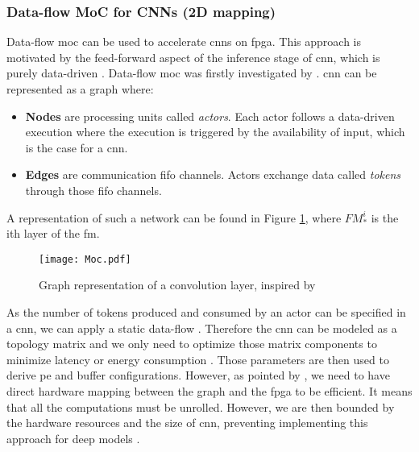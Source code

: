 \subsubsection{Data-flow MoC for CNNs (2D mapping)}
%
%
Data-flow \acrfull{moc} can be used to accelerate \acrshort{cnn}s on \acrshort{fpga}. This approach is motivated by the feed-forward aspect of the inference stage of \acrshort{cnn}, which is purely data-driven \cite{abdelouahab_accelerating_2018}. Data-flow \acrfull{moc} was firstly investigated by \textcite{lin_li_low_2016}. \acrshort{cnn} can be represented as a graph where:
\begin{itemize}
    \item \textbf{Nodes} are processing units called \textit{actors}. Each actor follows a data-driven execution where the execution is triggered by the availability of input, which is the case for a \acrshort{cnn}.
    \item \textbf{Edges} are communication \acrshort{fifo} channels. Actors exchange data called \textit{tokens} through those \acrshort{fifo} channels.
\end{itemize}
A representation of such a network can be found in Figure \ref{fig:moc}, where $FM_{*}^{i}$ is the ith layer of the \acrshort{fm}.
%
\begin{figure}[H]
    \centering
    \texttt{[image: Moc.pdf]}
    \caption{Graph representation of a convolution layer, inspired by \cite{abdelouahab_accelerating_2018}}
    \label{fig:moc}
\end{figure}

As the number of tokens produced and consumed by an actor can be specified in a \acrshort{cnn}, we can apply a static data-flow \cite{lee_static_1987}. Therefore the \acrshort{cnn} can be modeled as a topology matrix and we only need to optimize those matrix components to minimize latency or energy consumption \cite{venieris_latency-driven_2017}. Those parameters are then used to derive \acrshort{pe} and buffer configurations. However, as pointed by \textcite{abdelouahab_tactics_2017}, we need to have direct hardware mapping between the graph and the \acrshort{fpga} to be efficient. It means that all the computations must be unrolled. However, we are then bounded by the hardware resources and the size of \acrshort{cnn}, preventing implementing this approach for deep models \cite{abdelouahab_accelerating_2018}.
%
